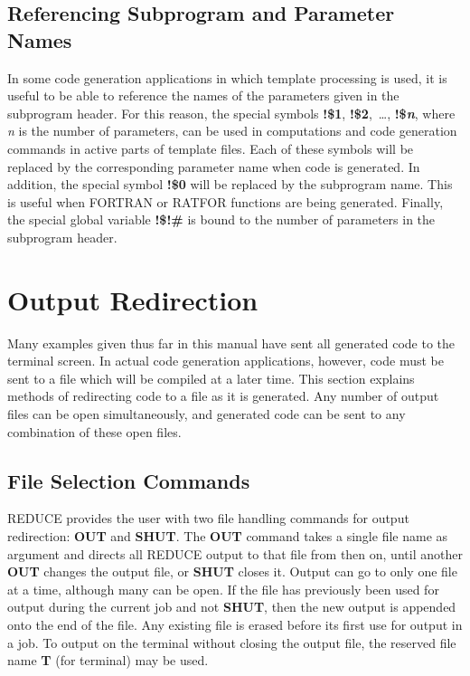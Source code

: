 \subsection{Referencing Subprogram and Parameter Names}
 
In some code generation applications in which template processing is used,
it is useful to be able to reference the names of the parameters
given in the subprogram header.  For this reason, the special
symbols {\bf !\$1}, {\bf !\$2},~\dots, {\bf !\${\it n}}, where {\it n}
is the number
of parameters, can be used in computations and code generation commands in
active parts of template files.  Each of these symbols will be replaced by
the corresponding parameter name when code is generated.  In addition, the
special symbol {\bf !\$0} will be replaced by the subprogram name.  This is
useful when FORTRAN or RATFOR functions are being generated.  Finally, the
special global variable {\bf !\$!\#} is bound to the number of parameters in
the subprogram header.

\section{Output Redirection}\label{GENTRAN:output}
Many examples given thus far in this manual have sent all generated code to
the terminal screen.  In actual code generation applications, however,
code must be sent to a file which will be compiled at a later
time.  This section explains methods of redirecting code to a
file as it is generated.  Any number of output files can be open
simultaneously, and generated code can be sent to any combination
of these open files.

\subsection{File Selection Commands}
\label{file:selection}
 
REDUCE provides the user with two file handling commands for output
redirection: {\bf OUT} and {\bf SHUT}.  The {\bf OUT} command takes a
single file name as argument and directs all REDUCE output to that
file from then on, until another {\bf OUT} changes the output file, or
{\bf SHUT} closes it.  Output can go to only one file at a time,
although many can be open.  If the file has previously been used for
output during the current job and not {\bf SHUT}, then the new output
is appended onto the end of the file.  Any existing file is erased
before its first use for output in a job.  To output on the terminal
without closing the output file, the reserved file name {\bf T} (for
terminal) may be used.

